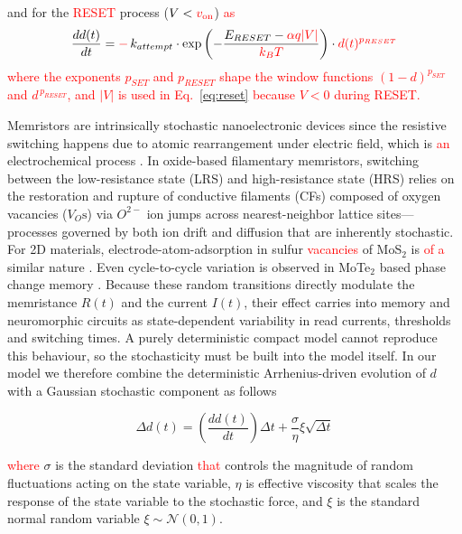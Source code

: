 \documentclass[aip,apl,reprint,floatfix]{revtex4-2}
\newcommand{\changed}[1]{\textcolor{red}{#1}}
\begin{document}
and for the \changed{RESET} process ($V < \changed{v_{\text{on}}}$) \changed{as}
\begin{equation}
    \frac{dd(t)}{dt} = \changed{-\,}k_{attempt} \cdot \exp\left( -\frac{E_{RESET} - \changed{\alpha q|V|}}{\changed{k_B T}} \right) \cdot \changed{d(t)^{p_{RESET}}}
    \label{eq:reset}
\end{equation}
\changed{\noindent where the exponents $p_{SET}$ and $p_{RESET}$ shape the window functions $(1-d)^{p_{SET}}$ and $d^{\,p_{RESET}}$, and $|V|$ is used in Eq.~\eqref{eq:reset} because $V<0$ during RESET.}

Memristors are intrinsically stochastic nanoelectronic devices since the resistive switching happens due to atomic rearrangement under electric field, which is \changed{an} electrochemical process \cite{Filatov,Lee}. In oxide-based filamentary memristors, switching between the low-resistance state (LRS) and high-resistance state (HRS) relies on the restoration and rupture of conductive filaments (CFs) composed of oxygen vacancies ($V_O\text{s}$) via $O^{2-}$ ion jumps across nearest-neighbor lattice sites—processes governed by both ion drift and diffusion that are inherently stochastic. For 2D materials, electrode-atom-adsorption in sulfur \changed{vacancies} of MoS$_2$ is \changed{of a} similar nature \cite{Tsai2017}. Even cycle-to-cycle variation is observed in MoTe$_2$ based phase change memory \cite{Hong}.  Because these random transitions directly modulate the memristance $R(t)$ and the current $I(t)$, their effect carries into memory and neuromorphic circuits as state-dependent variability in read currents, thresholds and switching times. A purely deterministic compact model cannot reproduce this behaviour, so the stochasticity must be built into the model itself. In our model we therefore combine the deterministic Arrhenius-driven evolution of $d$ with a Gaussian stochastic component as follows

\begin{equation}
\Delta d(t) = \left( \frac{dd(t)}{dt} \right) \Delta t + \frac{\sigma}{\eta} \xi \sqrt{\Delta t}
\end{equation}

\noindent \changed{where} $\sigma$ is the standard deviation \changed{that} controls the magnitude of random fluctuations acting on the state variable, $\eta$ is effective viscosity that scales the response of the state variable to the stochastic force, and $\xi$ is the standard normal random variable $\xi \sim \mathcal{N}(0,1)$.
\end{document}
